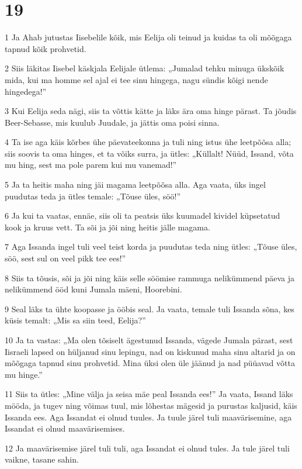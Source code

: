 \chapter{19}

\par 1 Ja Ahab jutustas Iisebelile kõik, mis Eelija oli teinud ja kuidas ta oli mõõgaga tapnud kõik prohvetid.
\par 2 Siis läkitas Iisebel käskjala Eelijale ütlema: „Jumalad tehku minuga ükskõik mida, kui ma homme sel ajal ei tee sinu hingega, nagu sündis kõigi nende hingedega!”
\par 3 Kui Eelija seda nägi, siis ta võttis kätte ja läks ära oma hinge pärast. Ta jõudis Beer-Sebasse, mis kuulub Juudale, ja jättis oma poisi sinna.
\par 4 Ta ise aga käis kõrbes ühe päevateekonna ja tuli ning istus ühe leetpõõsa alla; siis soovis ta oma hinges, et ta võiks surra, ja ütles: „Küllalt! Nüüd, Issand, võta mu hing, sest ma pole parem kui mu vanemad!”
\par 5 Ja ta heitis maha ning jäi magama leetpõõsa alla. Aga vaata, üks ingel puudutas teda ja ütles temale: „Tõuse üles, söö!”
\par 6 Ja kui ta vaatas, ennäe, siis oli ta peatsis üks kuumadel kividel küpsetatud kook ja kruus vett. Ta sõi ja jõi ning heitis jälle magama.
\par 7 Aga Issanda ingel tuli veel teist korda ja puudutas teda ning ütles: „Tõuse üles, söö, sest sul on veel pikk tee ees!”
\par 8 Siis ta tõusis, sõi ja jõi ning käis selle söömise rammuga nelikümmend päeva ja nelikümmend ööd kuni Jumala mäeni, Hoorebini.
\par 9 Seal läks ta ühte koopasse ja ööbis seal. Ja vaata, temale tuli Issanda sõna, kes küsis temalt: „Mis sa siin teed, Eelija?”
\par 10 Ja ta vastas: „Ma olen tõsiselt ägestunud Issanda, vägede Jumala pärast, sest Iisraeli lapsed on hüljanud sinu lepingu, nad on kiskunud maha sinu altarid ja on mõõgaga tapnud sinu prohvetid. Mina üksi olen üle jäänud ja nad püüavad võtta mu hinge.”
\par 11 Siis ta ütles: „Mine välja ja seisa mäe peal Issanda ees!” Ja vaata, Issand läks mööda, ja tugev ning võimas tuul, mis lõhestas mägesid ja purustas kaljusid, käis Issanda ees. Aga Issandat ei olnud tuules. Ja tuule järel tuli maavärisemine, aga Issandat ei olnud maavärisemises.
\par 12 Ja maavärisemise järel tuli tuli, aga Issandat ei olnud tules. Ja tule järel tuli vaikne, tasane sahin.
